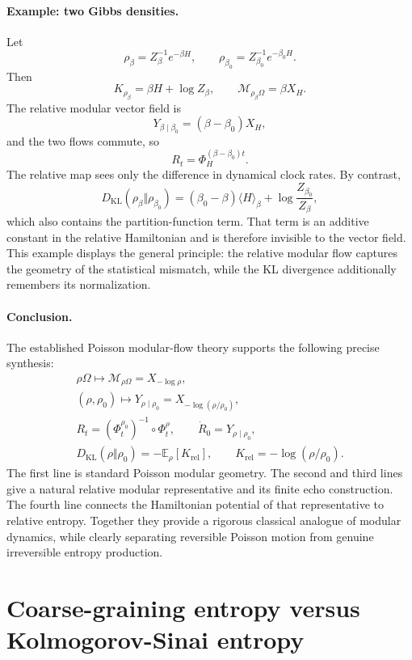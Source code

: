 \documentclass[a4paper,11pt]{article}
\theoremstyle{definition}
\newcommand{\KLL}{D_{\mathrm{KL}}}
\begin{document}
\paragraph{Example: two Gibbs densities.}
Let
\[
\rho_\beta=Z_\beta^{-1}e^{-\beta H},
\qquad
\rho_{\beta_0}=Z_{\beta_0}^{-1}e^{-\beta_0H}.
\]
Then
\[
K_{\rho_\beta}=\beta H+\log Z_\beta,
\qquad
\mathcal{M}_{\rho_\beta\Omega}=\beta X_H.
\]
The relative modular vector field is
\[
Y_{\beta\mid\beta_0}
=(\beta-\beta_0)X_H,
\]
and the two flows commute, so
\[
R_t=\Phi_H^{(\beta-\beta_0)t}.
\]
The relative map sees only the difference in dynamical clock rates.  By contrast,
\[
\KLL(\rho_\beta\Vert\rho_{\beta_0})
=
(\beta_0-\beta)\langle H\rangle_\beta
+
\log\frac{Z_{\beta_0}}{Z_\beta},
\]
which also contains the partition-function term.  That term is an additive constant in the relative Hamiltonian and is therefore invisible to the vector field.  This example displays the general principle: the relative modular flow captures the geometry of the statistical mismatch, while the KL divergence additionally remembers its normalization.

\paragraph{Conclusion.}
The established Poisson modular-flow theory supports the following precise synthesis:
\[
\boxed{
\begin{gathered}
\rho\Omega
\longmapsto
\mathcal{M}_{\rho\Omega}=X_{-\log\rho},\\[1mm]
(\rho,\rho_0)
\longmapsto
Y_{\rho\mid\rho_0}=X_{-\log(\rho/\rho_0)},\\[1mm]
R_t=(\Phi_t^{\rho_0})^{-1}\circ\Phi_t^\rho,
\qquad
\dot R_0=Y_{\rho\mid\rho_0},\\[1mm]
\KLL(\rho\Vert\rho_0)
=-\mathbb E_{\rho}[K_{\mathrm{rel}}],
\qquad
K_{\mathrm{rel}}=-\log(\rho/\rho_0).
\end{gathered}
}
\]
The first line is standard Poisson modular geometry.  The second and third lines give a natural relative modular representative and its finite echo construction.  The fourth line connects the Hamiltonian potential of that representative to relative entropy.  Together they provide a rigorous classical analogue of modular dynamics, while clearly separating reversible Poisson motion from genuine irreversible entropy production.

\section{Coarse-graining entropy versus Kolmogorov-Sinai entropy}
\end{document}
